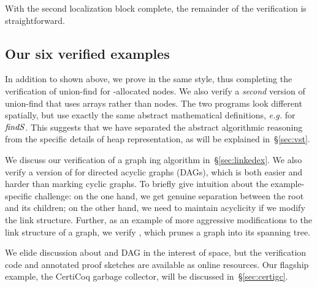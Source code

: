 With the second localization block complete, the remainder of the verification is straightforward.


\subsection{Our six verified examples}
\label{sec:application}

In addition to  shown above, we prove 
in the same style, thus completing the verification of 
union-find for -allocated nodes.
We also verify a \emph{second} version of union-find that uses
arrays rather than nodes. The two programs look different spatially, but 
use exactly the same abstract mathematical definitions,
\emph{e.g.} for $\mathit{findS}$. 
This suggests that we have separated the abstract algorithmic 
reasoning from the specific details of heap representation, as will be explained
in~\S\ref{sec:vst}.

We discuss our verification of a graph ing algorithm 
in~\S\ref{sec:linkedex}. We also verify a version of  
for directed acyclic graphs (DAGs), which is both easier and harder than 
marking cyclic graphs. To briefly give intuition about the example-specific 
challenge: on the one hand, we get genuine separation
between the root and its children; on the other hand, we need to maintain acyclicity if
we modify the link structure.
Further, as an example of more aggressive modifications to the link structure 
of a graph, we verify , which prunes a graph into its 
spanning tree. 

We elide discussion about  and DAG  
in the interest of space, but the verification code and annotated proof sketches 
are available as online resources.
Our flagship example, the CertiCoq garbage collector, will be discussed in~\S\ref{sec:certigc}.


